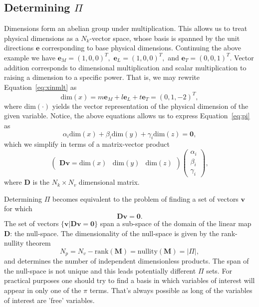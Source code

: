 \documentclass[11pt]{article}
\begin{document}
\subsection{Determining $\Pi$}
Dimensions form an abelian group under multiplication. This allows us to treat physical dimensions as a $N_k$-vector space, whose basis is spanned by the unit directions $\mathbf{e}$ corresponding to base physical dimensions. Continuing the above example we have $\mathbf{e}_M=(1,0,0)^T,$ $\mathbf{e}_L=(1,0,0)^T,$ and $\mathbf{e}_T=(0,0,1)^T$. Vector addition corresponds to dimensional multiplication and scalar multiplication to raising a dimension to a specific power. That is, we may rewrite Equation~\ref{eq:xinmlt} as 
\begin{equation}
    \text{dim}(x)= m\mathbf{e}_M + l\mathbf{e}_L + t\mathbf{e}_T = (0,1,-2)^T,
\end{equation}
where $\text{dim}(\cdot)$ yields the vector representation of the physical dimension of the given variable. Notice, the above equations allows us to express Equation~\ref{eq:pi} as
\begin{equation}
    \alpha_i\text{dim}(x) + \beta_i\text{dim}(y) + \gamma_i\text{dim}(z) = \mathbf{0},
\end{equation}
which we simplify in terms of a matrix-vector product
\begin{equation}
    \begin{pmatrix} \mathbf{D}\mathbf{v} = \text{dim}(x) & \text{dim}(y) & \text{dim}(z)\end{pmatrix}\begin{pmatrix} \alpha_i \\ \beta_i \\ \gamma_i\end{pmatrix},
\end{equation}
where $\mathbf{D}$ is the $N_k \times N_v$ dimensional matrix.

Determining $\Pi$ becomes equivalent to the problem of finding a set of vectors $\mathbf{v}$ for which
\begin{equation}
    \mathbf{D}\mathbf{v}=\mathbf{0}.
\end{equation}
The set of vectors $\{\mathbf{v}|\mathbf{D}\mathbf{v}=\mathbf{0}\}$ span a sub-space of the domain of the linear map $\mathbf{D}$: the null-space. The dimensionality of the null-space is given by the rank-nullity theorem
\begin{equation}
    N_p = N_v - \text{rank}(\mathbf{M}) = \text{nullity}(\mathbf{M}) = |\Pi|,
\end{equation}
and determines the number of independent dimensionless products. The span of the null-space is not unique and this leads potentially different $\Pi$ sets. For practical purposes one should try to find a basis in which variables of interest will appear in only one of the $\pi$ terms. That's always possible as long of the variables of interest are 'free' variables. 
\end{document}
